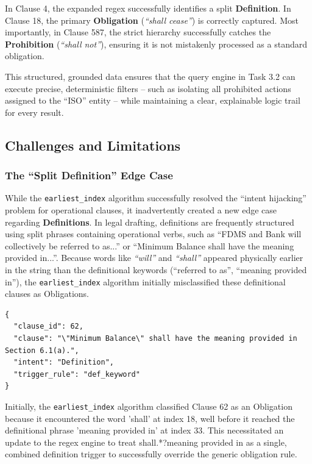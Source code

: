 \documentclass[twoside,final]{hcmut-report}
\begin{document}
In Clause 4, the expanded regex successfully identifies a split \textbf{Definition}. In Clause 18, the primary \textbf{Obligation} (\emph{``shall cease''}) is correctly captured. Most importantly, in Clause 587, the strict hierarchy successfully catches the \textbf{Prohibition} (\emph{``shall not''}), ensuring it is not mistakenly processed as a standard obligation.

This structured, grounded data ensures that the query engine in Task 3.2 can execute precise, deterministic filters -- such as isolating all prohibited actions assigned to the ``ISO'' entity -- while maintaining a clear, explainable logic trail for every result.

\subsection{Challenges and Limitations}
\subsubsection*{The ``Split Definition'' Edge Case}
While the \texttt{earliest\_index} algorithm successfully resolved the ``intent hijacking'' problem for operational clauses, it inadvertently created a new edge case regarding \textbf{Definitions}. In legal drafting, definitions are frequently structured using split phrases containing operational verbs, such as ``FDMS and Bank will collectively be referred to as...'' or ``Minimum Balance shall have the meaning provided in...''. Because words like \emph{``will''} and \emph{``shall''} appeared physically earlier in the string than the definitional keywords (``referred to as'', ``meaning provided in''), the \texttt{earliest\_index} algorithm initially misclassified these definitional clauses as Obligations.
\begin{verbatim}
{
  "clause_id": 62,
  "clause": "\"Minimum Balance\" shall have the meaning provided in Section 6.1(a).",
  "intent": "Definition",
  "trigger_rule": "def_keyword"
}
\end{verbatim}

Initially, the \texttt{earliest\_index} algorithm classified Clause 62 as an Obligation because it encountered the word 'shall' at index 18, well before it reached the definitional phrase 'meaning provided in' at index 33. This necessitated an update to the regex engine to treat shall.*?meaning provided in as a single, combined definition trigger to successfully override the generic obligation rule.
\end{document}
